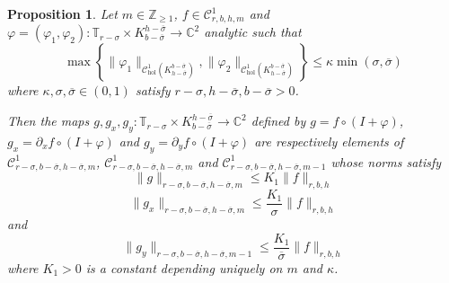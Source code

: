\documentclass[10pt]{article}
\newtheorem{proposition}[theorem]{Proposition}
\newcommand{\Z}{\mathbb{Z}}
\newcommand{\C}{\mathbb{C}}
\newcommand{\T}{\mathbb{T}}
\begin{document}
\begin{proposition}
\label{proposition:composition_estimates}
Let $m\in\Z_{\geq 1}$, $f\in\mathscr C^1_{r,b,h,m}$ and $\varphi=(\varphi_1,\varphi_2):\T_{r-\sigma}\times K_{b-\overline\sigma}^{h-\overline\sigma}\to\C^2$ analytic such that 
\begin{equation}
\label{eq:size_compo}
\max\left\{\|\varphi_1\|_{\mathscr C_{\text{hol}}^1(K_{h-\overline\sigma}^{b-\overline\sigma})}, \|\varphi_2\|_{\mathscr C_{\text{hol}}^1(K_{h-\overline\sigma}^{b-\overline\sigma})} 
\right\}
\leq \kappa\min(\sigma,\overline\sigma)
\end{equation}
where $\kappa,\sigma,\overline\sigma\in(0,1)$ satisfy $r-\sigma,h-\overline\sigma,b-\overline\sigma>0$. 

Then the maps $g,g_x,g_y:\T_{r-\sigma}\times K_{b-\overline\sigma}^{h-\overline\sigma}\to \C^2$ defined by $g=f\circ(I+\varphi)$, $g_x=\partial_xf\circ(I+\varphi)$ and $g_y=\partial_yf\circ(I+\varphi)$ are respectively elements of $\mathscr C^1_{r-\sigma,b-\overline\sigma,h-\overline\sigma,m}$, $\mathscr C^1_{r-\sigma,b-\overline\sigma,h-\overline\sigma,m}$ and $\mathscr C^1_{r-\sigma,b-\overline\sigma,h-\overline\sigma,m-1}$ whose norms satisfy
\begin{equation}
 \label{equation:inequality_composition}
 \|g\|_{r-\sigma,b-\overline\sigma,h-\overline\sigma,m} \leq K_1\|f\|_{r,b,h}
\end{equation}
\[
\|g_x\|_{r-\sigma,b-\overline\sigma,h-\overline\sigma,m}\leq \frac{K_1}{\sigma}\|f\|_{r,b,h}
\]
and
\[
\|g_y\|_{r-\sigma,b-\overline\sigma,h-\overline\sigma,m-1}\leq \frac{K_1}{\overline\sigma}\|f\|_{r,b,h}
\]
where $K_1>0$ is a constant depending uniquely on $m$ and $\kappa$.
\end{proposition}
\end{document}
